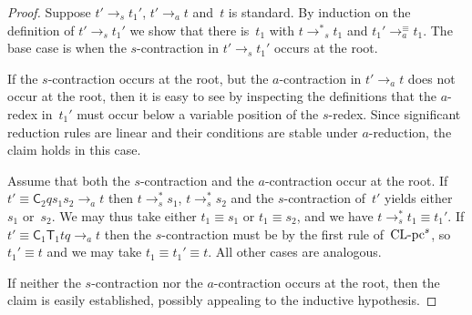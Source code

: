 \documentclass[a4paper,UKenglish]{lipics-v2016}
\newcommand{\Cs}{\mathsf{C}}
\newcommand{\Ts}{\mathsf{T}}
\newcommand{\reduces}{\ensuremath{\to^*}}
\newcommand{\CLCs}{{\mbox{${\text{\rm CL-pc}^s}$}}}
\begin{document}
\begin{proof}
  Suppose $t' \to_s t_1'$, $t' \to_a t$ and~$t$ is standard. By
  induction on the definition of $t' \to_s t_1'$ we show that there
  is~$t_1$ with $t \reduces_s t_1$ and $t_1' \to_a^\equiv t_1$. The
  base case is when the $s$-contraction in $t' \to_s t_1'$ occurs at
  the root.

  If the $s$-contraction occurs at the root, but the $a$-contraction
  in $t' \to_a t$ does not occur at the root, then it is easy to see
  by inspecting the definitions that the $a$-redex in~$t_1'$ must
  occur below a variable position of the $s$-redex. Since significant
  reduction rules are linear and their conditions are stable under
  $a$-reduction, the claim holds in this case.

  Assume that both the $s$-contraction and the $a$-contraction occur
  at the root. If $t' \equiv \Cs_2 q s_1 s_2 \to_a t$ then
  $t \to_s^{*} s_1$, $t \to_s^{*} s_2$ and the $s$-contraction of~$t'$
  yields either~$s_1$ or~$s_2$. We may thus take either
  $t_1 \equiv s_1$ or $t_1 \equiv s_2$, and we have
  $t \to_s^{*} t_1 \equiv t_1'$. If
  $t' \equiv \Cs_1 \Ts_1 t q \to_a t$ then the $s$-contraction must be
  by the first rule of~$\CLCs$, so $t_1' \equiv t$ and we may take
  $t_1 \equiv t_1' \equiv t$. All other cases are analogous.

  If neither the $s$-contraction nor the $a$-contraction occurs at the
  root, then the claim is easily established, possibly appealing to
  the inductive hypothesis.


\end{proof}
\end{document}
